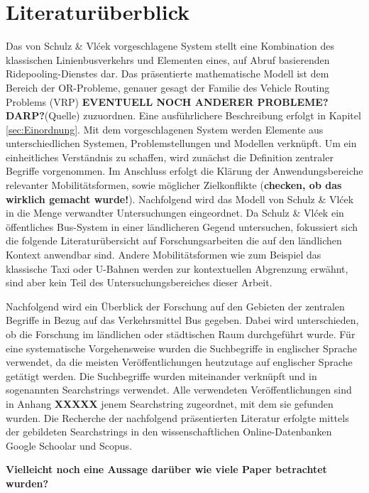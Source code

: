
\chapter{Literaturüberblick}
\label{chapter:2}
Das von Schulz \& Vlćek vorgeschlagene System stellt eine Kombination des klassischen Linienbusverkehrs und Elementen eines, auf Abruf basierenden Ridepooling-Dienstes dar. Das präsentierte mathematische Modell ist dem Bereich der OR-Probleme, genauer gesagt der Familie des Vehicle Routing Problems (VRP) \textbf{EVENTUELL NOCH ANDERER PROBLEME? DARP?}(Quelle) zuzuordnen. Eine ausführlichere Beschreibung erfolgt in Kapitel \ref{sec:Einordnung}. Mit dem vorgeschlagenen System werden Elemente aus unterschiedlichen Systemen, Problemstellungen und Modellen verknüpft. Um ein einheitliches Verständnis zu schaffen, wird zunächst die Definition zentraler Begriffe vorgenommen. Im Anschluss erfolgt die Klärung der Anwendungsbereiche relevanter Mobilitätsformen, sowie möglicher Zielkonflikte (\textbf{checken, ob das wirklich gemacht wurde!}). Nachfolgend wird das Modell von Schulz \& Vlćek in die Menge verwandter Untersuchungen eingeordnet. Da Schulz \& Vlćek ein öffentliches Bus-System in einer ländlicheren Gegend untersuchen, fokussiert sich die folgende Literaturübersicht auf Forschungsarbeiten die auf den ländlichen Kontext anwendbar sind. Andere Mobilitätsformen wie zum Beispiel das klassische Taxi oder U-Bahnen werden zur kontextuellen Abgrenzung erwähnt, sind aber kein Teil des Untersuchungsbereiches dieser Arbeit.

Nachfolgend wird ein Überblick der Forschung auf den Gebieten der zentralen Begriffe in Bezug auf das Verkehrsmittel Bus gegeben. Dabei wird unterschieden, ob die Forschung im ländlichen oder städtischen Raum durchgeführt wurde. Für eine  systematische Vorgehensweise wurden die Suchbegriffe in englischer Sprache verwendet, da die meisten Veröffentlichungen heutzutage auf englischer Sprache getätigt werden. Die Suchbegriffe wurden miteinander verknüpft und in sogenannten Searchstrings verwendet. Alle verwendeten Veröffentlichungen sind in Anhang \textbf{XXXXX} jenem Searchstring zugeordnet, mit dem sie gefunden wurden. Die Recherche der nachfolgend präsentierten Literatur erfolgte mittels der gebildeten Searchstrings in den wissenschaftlichen Online-Datenbanken Google Schoolar und Scopus. 

\textbf{Vielleicht noch eine Aussage darüber wie viele Paper betrachtet wurden?}

